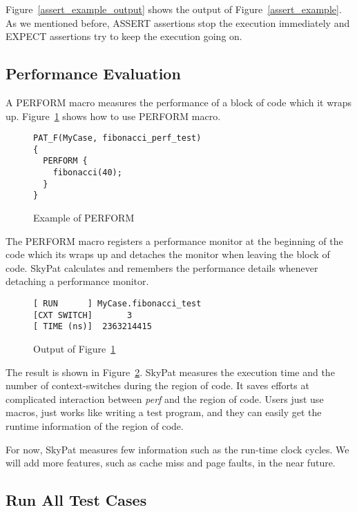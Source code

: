 \documentclass[final]{ols}
\begin{document}
Figure~\ref{assert_example_output} shows the output of Figure~\ref{assert_example}.
As we mentioned before, ASSERT assertions stop the execution immediately and EXPECT assertions try to keep the execution going on.

\subsection{Performance Evaluation}

A PERFORM macro measures the performance of a block of code which it wraps up.
Figure~\ref{perform_example} shows how to use PERFORM macro.

\begin{figure}[h]
\lstset{language=C++}
\begin{lstlisting}[frame=single]
PAT_F(MyCase, fibonacci_perf_test)
{
  PERFORM {
    fibonacci(40);
  }
}
\end{lstlisting}
\caption{Example of PERFORM}
\label{perform_example}
\end{figure}

The PERFORM macro registers a performance monitor at the beginning of the code which its wraps up and detaches the monitor when leaving the block of code.
SkyPat calculates and remembers the performance details whenever detaching a performance monitor.

\begin{figure}[h]
\lstset{language=sh}
\begin{lstlisting}[frame=single]
[ RUN      ] MyCase.fibonacci_test
[CXT SWITCH]       3
[ TIME (ns)]  2363214415
\end{lstlisting}
\caption{Output of Figure~\ref{perform_example}}
\label{perform_example_output}
\end{figure}

The result is shown in Figure~\ref{perform_example_output}.
SkyPat measures the execution time and the number of context-switches during the region of code.
It saves efforts at complicated interaction between \textit{perf} and the region of code.
Users just use macros, just works like writing a test program, and they can easily get the runtime information of the region of code.

For now, SkyPat measures few information such as the run-time clock cycles.
We will add more features, such as cache miss and page faults, in the near future.

\subsection{Run All Test Cases}
\end{document}
